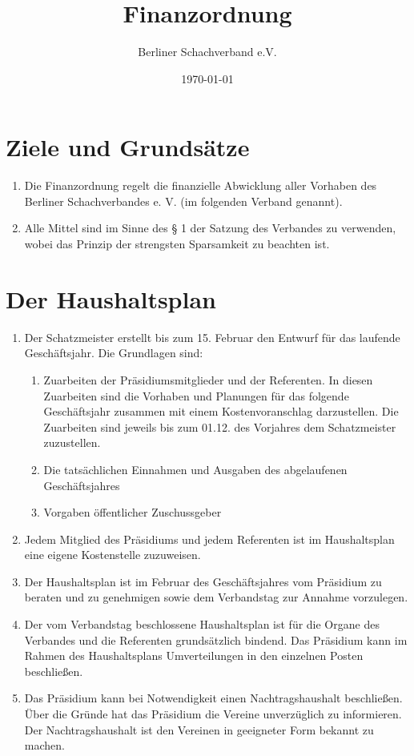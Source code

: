\documentclass[fontsize=12pt, paper=a4, ngerman]{article}
\begin{document}
\author{ Berliner Schachverband e.V. } \title{Finanzordnung} \date{\today} \maketitle

\tableofcontents

\newpage

\section{Ziele und Grundsätze}

\begin{enumerate}
\item Die Finanzordnung regelt die finanzielle Abwicklung aller Vorhaben des Berliner
Schachverbandes e. V. (im folgenden Verband genannt).

\item Alle Mittel sind im Sinne des § 1 der Satzung des Verbandes zu verwenden, wobei das
Prinzip der strengsten Sparsamkeit zu beachten ist.
\end{enumerate}

\section{Der Haushaltsplan}

\begin{enumerate}
\item Der Schatzmeister erstellt bis zum 15. Februar den Entwurf für das laufende
Geschäftsjahr. Die Grundlagen sind:
  \begin{enumerate}[label=\alph*)]
  \item Zuarbeiten der Präsidiumsmitglieder und der Referenten. In diesen Zuarbeiten sind
  die Vorhaben und Planungen für das folgende Geschäftsjahr zusammen mit einem
  Kostenvoranschlag darzustellen. Die Zuarbeiten sind jeweils bis zum 01.12. des
  Vorjahres dem Schatzmeister zuzustellen.
  \item Die tatsächlichen Einnahmen und Ausgaben des abgelaufenen Geschäftsjahres
  \item Vorgaben öffentlicher Zuschussgeber
  \end{enumerate}
\item Jedem Mitglied des Präsidiums und jedem Referenten ist im Haushaltsplan eine eigene
Kostenstelle zuzuweisen.
\item Der Haushaltsplan ist im Februar des Geschäftsjahres vom Präsidium zu beraten und zu
genehmigen sowie dem Verbandstag zur Annahme vorzulegen.
\item Der vom Verbandstag beschlossene Haushaltsplan ist für die Organe des Verbandes und
die Referenten grundsätzlich bindend. Das Präsidium kann im Rahmen des
Haushaltsplans Umverteilungen in den einzelnen Posten beschließen.
\item Das Präsidium kann bei Notwendigkeit einen Nachtragshaushalt beschließen. Über die
Gründe hat das Präsidium die Vereine unverzüglich zu informieren. Der Nachtragshaushalt
ist den Vereinen in geeigneter Form bekannt zu machen.
\end{enumerate}  
\end{document}
